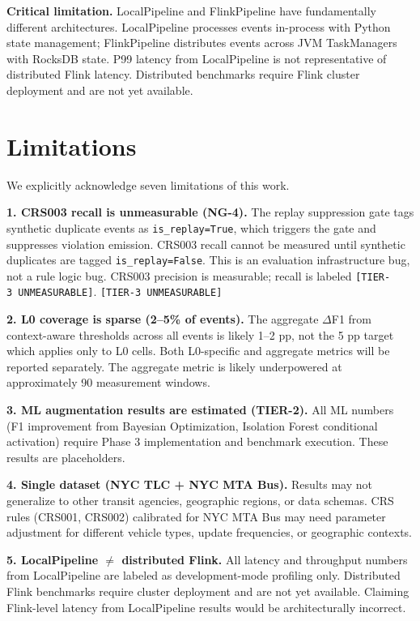 \textbf{Critical limitation.} LocalPipeline and FlinkPipeline have fundamentally
different architectures. LocalPipeline processes events in-process with Python
state management; FlinkPipeline distributes events across JVM TaskManagers with
RocksDB state. P99 latency from LocalPipeline is not representative of
distributed Flink latency. Distributed benchmarks require Flink cluster
deployment and are not yet available.

\section{Limitations}
\label{sec:ch3-limitations}

We explicitly acknowledge seven limitations of this work.

\textbf{1. CRS003 recall is unmeasurable (NG-4).} The replay suppression
gate tags synthetic duplicate events as \texttt{is\_replay=True}, which
triggers the gate and suppresses violation emission. CRS003 recall
cannot be measured until synthetic duplicates are tagged
\texttt{is\_replay=False}. This is an evaluation infrastructure bug, not
a rule logic bug. CRS003 precision is measurable; recall is labeled
\texttt{[TIER-3\ UNMEASURABLE]}.
\texttt{[TIER-3\ UNMEASURABLE]}

\textbf{2. L0 coverage is sparse (2--5\% of events).} The aggregate
$\Delta$F1 from context-aware thresholds across all events is likely
1--2 pp, not the 5 pp target which applies only to L0 cells. Both
L0-specific and aggregate metrics will be reported separately. The aggregate
metric is likely underpowered at approximately 90 measurement windows.

\textbf{3. ML augmentation results are estimated (TIER-2).} All ML
numbers (F1 improvement from Bayesian Optimization, Isolation Forest
conditional activation) require Phase 3 implementation and benchmark
execution. These results are placeholders.

\textbf{4. Single dataset (NYC TLC + NYC MTA Bus).} Results may not
generalize to other transit agencies, geographic regions, or data schemas.
CRS rules (CRS001, CRS002) calibrated for NYC MTA Bus may need parameter
adjustment for different vehicle types, update frequencies, or geographic
contexts.

\textbf{5. LocalPipeline $\neq$ distributed Flink.} All latency and
throughput numbers from LocalPipeline are labeled as development-mode
profiling only. Distributed Flink benchmarks require cluster deployment
and are not yet available. Claiming Flink-level latency from LocalPipeline
results would be architecturally incorrect.

